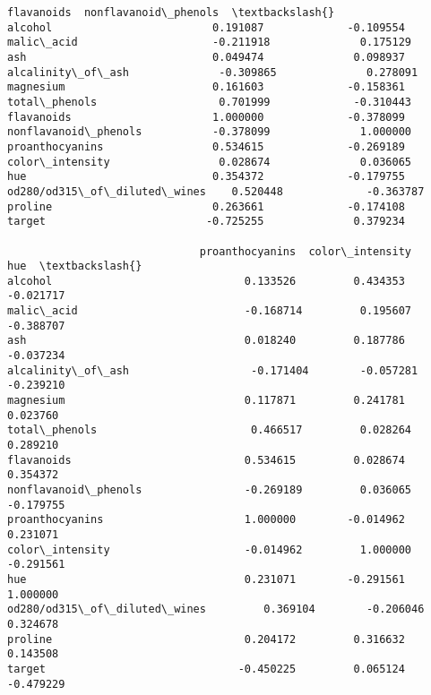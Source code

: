 \documentclass[11pt]{article}
\begin{document}
\begin{tcolorbox}[breakable, size=fbox, boxrule=.5pt, pad at break*=1mm, opacityfill=0]
\begin{Verbatim}[commandchars=\\\{\}]
                              flavanoids  nonflavanoid\_phenols  \textbackslash{}
alcohol                         0.191087             -0.109554
malic\_acid                     -0.211918              0.175129
ash                             0.049474              0.098937
alcalinity\_of\_ash              -0.309865              0.278091
magnesium                       0.161603             -0.158361
total\_phenols                   0.701999             -0.310443
flavanoids                      1.000000             -0.378099
nonflavanoid\_phenols           -0.378099              1.000000
proanthocyanins                 0.534615             -0.269189
color\_intensity                 0.028674              0.036065
hue                             0.354372             -0.179755
od280/od315\_of\_diluted\_wines    0.520448             -0.363787
proline                         0.263661             -0.174108
target                         -0.725255              0.379234

                              proanthocyanins  color\_intensity       hue  \textbackslash{}
alcohol                              0.133526         0.434353 -0.021717
malic\_acid                          -0.168714         0.195607 -0.388707
ash                                  0.018240         0.187786 -0.037234
alcalinity\_of\_ash                   -0.171404        -0.057281 -0.239210
magnesium                            0.117871         0.241781  0.023760
total\_phenols                        0.466517         0.028264  0.289210
flavanoids                           0.534615         0.028674  0.354372
nonflavanoid\_phenols                -0.269189         0.036065 -0.179755
proanthocyanins                      1.000000        -0.014962  0.231071
color\_intensity                     -0.014962         1.000000 -0.291561
hue                                  0.231071        -0.291561  1.000000
od280/od315\_of\_diluted\_wines         0.369104        -0.206046  0.324678
proline                              0.204172         0.316632  0.143508
target                              -0.450225         0.065124 -0.479229


\end{Verbatim}
\end{tcolorbox}
\end{document}
